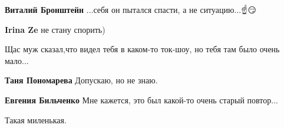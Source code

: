 \begin{itemize}
\begin{itemize}
 
\textbf{Виталий Бронштейн}
...себя он пытался спасти, а не ситуацию...☝️😏

 
\textbf{Irina Ze} не стану спорить)

\end{itemize}

 
Щас муж сказал,что видел тебя в каком-то ток-шоу, но тебя там было очень мало...

\begin{itemize}
 
\textbf{Таня Пономарева} Допускаю, но не знаю.

 
\textbf{Евгения Бильченко} Мне кажется, это был какой-то очень старый повтор...
\end{itemize}

 
Такая миленькая.


\end{itemize}
